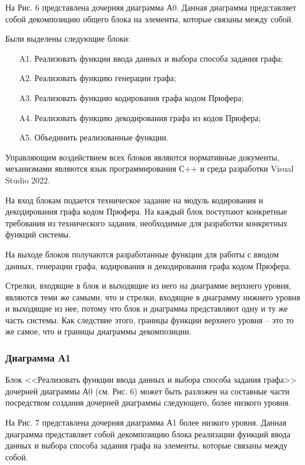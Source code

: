 \documentclass[a4paper, final]{article}
\begin{document}
На Рис. 6 представлена дочерняя диаграмма А0. Данная диаграмма представляет собой декомпозицию общего блока на 
элементы, которые связаны между собой.

Были выделены следующие блоки:

\begin{itemize}
	\item[A1.] Реализовать функции ввода данных и выбора способа задания графа;
	\item[A2.] Реализовать функцию генерации графа;
	\item[A3.] Реализовать функцию кодирования графа кодом Прюфера;
	\item[A4.] Реализовать функцию декодирования графа из кодов Прюфера;
	\item[A5.] Объединить реализованные функции.
\end{itemize} 

Управляющим воздействием всех блоков являются нормативные документы, механизмами являются язык программирования С++ 
и среда разработки Visual Studio 2022.

На вход блокам подается техническое задание на модуль кодирования и декодирования графа кодом Прюфера. На каждый 
блок поступают конкретные требования из технического задания, необходимые для разработки конкретных функций системы.

На выходе блоков получаются разработанные функции для работы с вводом данных, генерации графа, кодирования и декодирования графа кодом Прюфера.

Стрелки, входящие в блок и выходящие из него на диаграмме верхнего уровня, являются теми же самыми, что и стрелки, 
входящие в диаграмму нижнего уровня и выходящие из нее, потому что блок и диаграмма представляют одну и ту же 
часть системы. Как следствие этого, границы функции верхнего уровня -- это то же самое, что и границы диаграммы декомпозиции.

\newpage
\hypertarget{img:A0}{}



\subsubsection{Диаграмма А1}
Блок <<Реализовать функции ввода данных и выбора способа задания графа>> дочерней диаграммы А0 (см. Рис. 6) может быть разложен на составные части посредством создания дочерней диаграммы следующего, более низкого уровня.

На Рис. 7 представлена дочерняя диаграмма А1 более низкого уровня. Данная диаграмма представляет собой 
декомпозицию блока реализации функций ввода данных и выбора способа задания графа на элементы, которые связаны 
между собой. 
\end{document}
